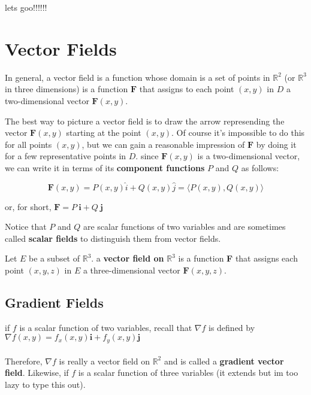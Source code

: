 \documentclass{article}
\begin{document}
lets goo!!!!!!



\newpage
\section{Vector Fields}

\begin{center}
    In general, a vector field is a function whose domain is a set of points in $\mathbb{R}^2$ (or $\mathbb{R}^3$ in three dimensions) is a function $\mathbf{F}$ that assigns to each point $(x,y)$ in $D$ a two-dimensional vector $\mathbf{F}(x,y)$. 
\end{center}

The best way to picture a vector field is to draw the arrow represending the vector $\mathbf{F}(x,y)$ starting at the point $(x,y)$. Of course it's impossible to do this for all points $(x,y)$, but we can gain a reasonable impression of $\mathbf{F}$ by doing it for a few representative points in $D$. since $\mathbf{F}(x,y)$ is a two-dimensional vector, we can write it in terms of its \textbf{component functions} $P$ and $Q$ as follows:

$$\mathbf{F}(x,y) = P(x,y)\hat{i} + Q(x,y) \hat{j} = \langle P(x,y), Q(x,y) \rangle$$

or, for short, $\mathbf{F} = P \ \mathbf{i} + Q \  \mathbf{j}$

Notice that $P$ and $Q$ are scalar functions of two variables and are sometimes called \textbf{scalar fields} to distinguish them from vector fields.

\begin{center}
    Let $E$ be a subset of $\mathbb{R}^3$. a \textbf{vector field on} $\mathbb{R}^3$ is a function \textbf{F} that assigns each point $(x,y,z)$ in $E$ a three-dimensional vector $\mathbf{F}(x,y,z)$.
\end{center}

\subsection{Gradient Fields}

if $f$ is a scalar function of two variables, recall that $\nabla f$ is defined by $\nabla f(x,y) = f_x(x,y)\mathbf{i} + f_y(x,y)\mathbf{j} $
\\ 
\\
Therefore, $\nabla f$ is really a vector field on $\mathbb{R}^2$ and is called a \textbf{gradient vector field}. Likewise, if $f$ is a scalar function of three variables (it extends but im too lazy to type this out).
\end{document}
